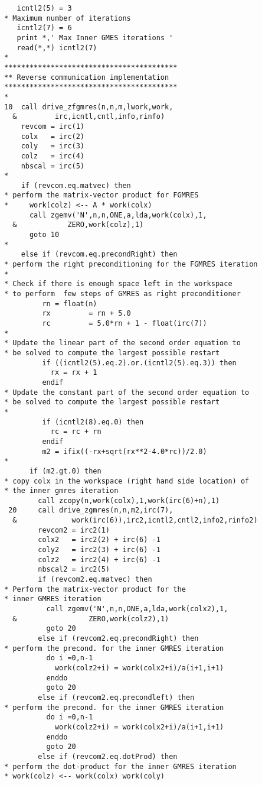 \begin{landscape}
\begin{small}
\begin{multicols}{2}
\begin{verbatim}
   icntl2(5) = 3
* Maximum number of iterations
   icntl2(7) = 6
   print *,' Max Inner GMES iterations '
   read(*,*) icntl2(7)
*
*****************************************
** Reverse communication implementation
*****************************************
*
10  call drive_zfgmres(n,n,m,lwork,work,
  &         irc,icntl,cntl,info,rinfo)
    revcom = irc(1)
    colx   = irc(2)
    coly   = irc(3)
    colz   = irc(4)
    nbscal = irc(5)
*
    if (revcom.eq.matvec) then
* perform the matrix-vector product for FGMRES 
*     work(colz) <-- A * work(colx)
      call zgemv('N',n,n,ONE,a,lda,work(colx),1,
  &            ZERO,work(colz),1)
      goto 10
*
    else if (revcom.eq.precondRight) then
* perform the right preconditioning for the FGMRES iteration
*
* Check if there is enough space left in the workspace 
* to perform  few steps of GMRES as right preconditioner
         rn = float(n)
         rx         = rn + 5.0
         rc         = 5.0*rn + 1 - float(irc(7))
*
* Update the linear part of the second order equation to 
* be solved to compute the largest possible restart
         if ((icntl2(5).eq.2).or.(icntl2(5).eq.3)) then
           rx = rx + 1
         endif
* Update the constant part of the second order equation to 
* be solved to compute the largest possible restart
*             
         if (icntl2(8).eq.0) then
           rc = rc + rn
         endif
         m2 = ifix((-rx+sqrt(rx**2-4.0*rc))/2.0)
*
      if (m2.gt.0) then
* copy colx in the workspace (right hand side location) of 
* the inner gmres iteration
        call zcopy(n,work(colx),1,work(irc(6)+n),1)
 20     call drive_zgmres(n,n,m2,irc(7),
  &             work(irc(6)),irc2,icntl2,cntl2,info2,rinfo2)
        revcom2 = irc2(1)
        colx2   = irc2(2) + irc(6) -1
        coly2   = irc2(3) + irc(6) -1
        colz2   = irc2(4) + irc(6) -1
        nbscal2 = irc2(5)
        if (revcom2.eq.matvec) then
* Perform the matrix-vector product for the 
* inner GMRES iteration
          call zgemv('N',n,n,ONE,a,lda,work(colx2),1,
  &                 ZERO,work(colz2),1)
          goto 20
        else if (revcom2.eq.precondRight) then
* perform the precond. for the inner GMRES iteration
          do i =0,n-1
            work(colz2+i) = work(colx2+i)/a(i+1,i+1)
          enddo
          goto 20
        else if (revcom2.eq.precondleft) then
* perform the precond. for the inner GMRES iteration
          do i =0,n-1
            work(colz2+i) = work(colx2+i)/a(i+1,i+1)
          enddo
          goto 20
        else if (revcom2.eq.dotProd) then
* perform the dot-product for the inner GMRES iteration
* work(colz) <-- work(colx) work(coly)

\end{verbatim}
\end{multicols}
\end{small}
\end{landscape}
